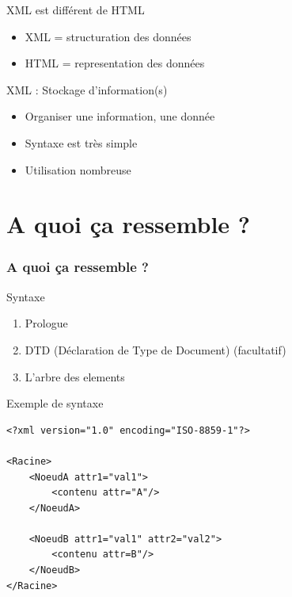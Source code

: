 \documentclass{beamer}
\begin{document}
\begin{frame}
    \begin{block}{XML est différent de HTML}
	\begin{itemize}
   \pause\item XML = structuration des données
   \pause\item HTML = representation des données \pause
\end{itemize}

\end{block}

\begin{block}{XML : Stockage d'information(s)}
	\begin{itemize}
	\pause\item Organiser une information, une donnée 
	\pause\item Syntaxe est très simple 
	\pause\item Utilisation nombreuse
\end{itemize}
\end{block}
\end{frame}

\section{A quoi ça ressemble ?}
\begin{frame}

\frametitle{A quoi ça ressemble ?}

	\begin{block}{Syntaxe}
		\begin{enumerate}
		\pause\item Prologue
		\pause\item DTD (Déclaration de Type de Document) \pause (facultatif)
		\pause\item L'arbre des elements
		\end{enumerate}

	\end{block}
\end{frame}


\begin{frame}[containsverbatim]


	\begin{block}{Exemple de syntaxe}
		\begin{Verbatim}[fontsize=\scriptsize]
<?xml version="1.0" encoding="ISO-8859-1"?>

<Racine>
	<NoeudA attr1="val1">
		<contenu attr="A"/>
	</NoeudA>

	<NoeudB attr1="val1" attr2="val2">
		<contenu attr=B"/>
	</NoeudB>
</Racine>
		\end{Verbatim}
	\end{block}
\end{frame}
\end{document}
